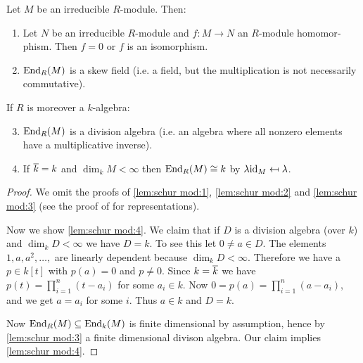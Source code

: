 \documentclass[12pt,a4paper]{scrartcl}
\theoremstyle{cplain}
\theoremstyle{cplain}
\theoremstyle{cplain}
\theoremstyle{definition}
\begin{document}
\begin{otherlanguage}{english}
\begin{lem} \label{lem:schur mod}
  Let $M$ be an irreducible $R$-module. Then:
  \begin{enumerate}
    \item Let $N$ be an irreducible $R$-module and $f\colon M\to N$ an $R$-module homomorphism. Then $f=0$ or $f$ is an isomorphism. \label{lem:schur mod:1}
    \item $\operatorname{End}_R(M)$ is a skew field (i.e. a field, but the multiplication is not necessarily commutative). \label{lem:schur mod:2}
  \end{enumerate}
  If $R$ is moreover a $k$-algebra:
  \begin{enumerate}
    \setcounter{enumi}{2}
    \item $\operatorname{End}_R(M)$ is a division algebra (i.e. an algebra where all nonzero elements have a multiplicative inverse). \label{lem:schur mod:3}
    \item If $\overline k = k$ and $\dim_k M <\infty $ then $\operatorname{End}_R(M) \cong k$ by $\lambda{\operatorname{id}_M} \mapsfrom \lambda$. \label{lem:schur mod:4}
  \end{enumerate}
\end{lem}
\begin{proof}
  We omit the proofs of \ref{lem:schur mod:1}, \ref{lem:schur mod:2} and \ref{lem:schur mod:3} (see the proof of  for representations).
  
  Now we show \ref{lem:schur mod:4}. We claim that if $D$ is a division algebra (over $k$) and $\dim_kD<\infty$ we have $D=k$. To see this let $0\neq a \in D$. The elements $1,a,a^2,\ldots,$ are linearly dependent because $\dim_kD < \infty$. Therefore we have a $p \in k[t]$ with $p(a) = 0$ and $p\neq 0$. Since $k=\overline k$ we have $p(t) = \prod_{i=1}^n(t-a_i)$ for some $a_i \in k$. Now $0 = p(a) = \prod_{i=1}^n(a-a_i)$, and we get $a=a_i$ for some $i$. Thus $a \in k$ and $D=k$.
  
  Now $\operatorname{End}_R(M) \subseteq \operatorname{End}_k(M)$ is finite dimensional by assumption, hence by \ref{lem:schur mod:3} a finite dimensional divison algebra. Our claim implies \ref{lem:schur mod:4}.
\end{proof}


\end{otherlanguage}
\end{document}
